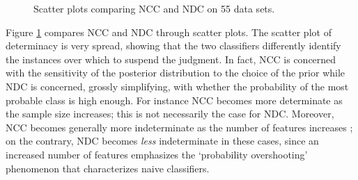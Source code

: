 \documentclass[a4paper,10pt,reqno]{amsart}
\theoremstyle{remark}
\begin{document}
\begin{figure}[!ht]
\centering
{}
\caption{Scatter plots comparing NCC and NDC on 55 data sets.\label{fig:ncc-ndc}}
\end{figure}

Figure \ref{fig:ncc-ndc} compares NCC and NDC through scatter plots.
The scatter plot of determinacy is very spread, showing that the two classifiers differently identify the instances over which to suspend the judgment.
In fact, NCC is concerned with the sensitivity of the posterior distribution to the choice of the prior while NDC is concerned, grossly simplifying, with whether the probability of the most probable class is high enough.
For instance  NCC becomes more determinate as the sample size increases; this is not necessarily the case for NDC. 
Moreover, NCC becomes generally more indeterminate as the number of features increases \cite{corani2008a}; on the contrary,  NDC 
becomes \textit{less} indeterminate in these cases, since an increased number of features emphasizes the `probability overshooting' \cite{hand2001idiot} phenomenon that characterizes naive classifiers.
\end{document}
